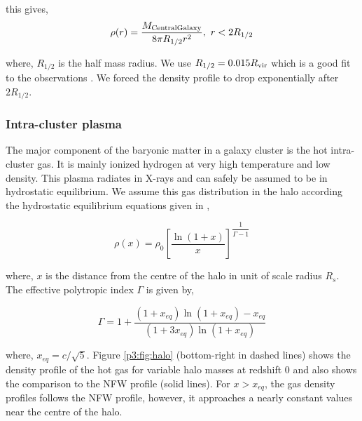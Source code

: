 \documentclass[
  11pt,
  twoside,
  openright,
  titlepage,
  headings=optiontoheadandtoc
]{scrbook}
\begin{document}
this gives,
\begin{equation}
	\rho(r) = \dfrac{M_{\rm CentralGalaxy}}{8 \pi R_{1/2} r^2},\ r<2R_{1/2}
\end{equation}

where, $R_{1/2}$ is the half mass radius. We use $R_{1/2} = 0.015 R_{\rm vir}$ which is a good fit to the observations \citep{2014arXiv1401.7329K}. We forced the density profile to drop exponentially after $2R_{1/2}$.




\subsubsection{Intra-cluster plasma}\label{p3:sec:gas}
\label{p3:sec:icm}

The major component of the baryonic matter in a galaxy cluster is the hot intra-cluster gas. It is mainly ionized hydrogen at very high temperature and low density. This plasma radiates in X-rays and can safely be assumed to be in hydrostatic equilibrium. We assume this gas distribution in the halo according the hydrostatic equilibrium equations given in \cite{2013MNRAS.432.1947M},

\begin{equation}
	\rho(x) = \rho_0 \left[\dfrac{\ln(1+x)}{x}  \right]^{\dfrac{1}{\Gamma -1}}
\end{equation}

where, $x$ is the distance from the centre of the halo in unit of scale radius $R_s$. The effective polytropic index $\Gamma$ is given by,

\begin{equation}
	\Gamma = 1+ \dfrac{(1+x_{eq})\ln(1+x_{eq}) - x_{eq}}{(1+3x_{eq})\ln(1+x_{eq})}
\end{equation}

where, $x_{eq}=c/\sqrt{5}$. Figure \ref{p3:fig:halo} (bottom-right in dashed lines) shows the density profile of the hot gas for variable halo masses at redshift 0 and also shows the comparison to the NFW profile (solid lines). For $x>x_{eq}$, the gas density profiles follows the NFW profile, however, it approaches a nearly constant values near the centre of the halo. 
\end{document}
